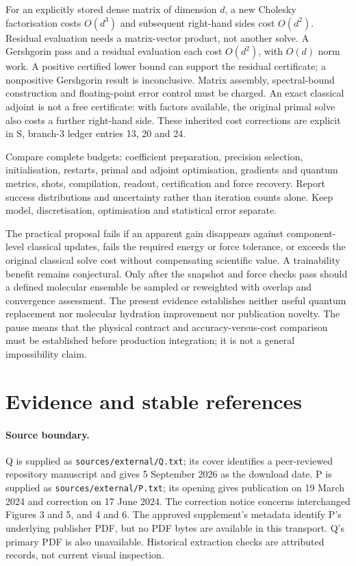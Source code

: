 \documentclass{article}
\begin{document}
For an explicitly stored dense matrix of dimension $d$, a new Cholesky factorisation costs $O(d^3)$ and subsequent right-hand sides cost $O(d^2)$. Residual evaluation needs a matrix-vector product, not another solve. A Gershgorin pass and a residual evaluation each cost $O(d^2)$, with $O(d)$ norm work. A positive certified lower bound can support the residual certificate; a nonpositive Gershgorin result is inconclusive. Matrix assembly, spectral-bound construction and floating-point error control must be charged. An exact classical adjoint is not a free certificate: with factors available, the original primal solve also costs a further right-hand side. These inherited cost corrections are explicit in S, branch-3 ledger entries 13, 20 and 24.

Compare complete budgets: coefficient preparation, precision selection, initialisation, restarts, primal and adjoint optimisation, gradients and quantum metrics, shots, compilation, readout, certification and force recovery. Report success distributions and uncertainty rather than iteration counts alone. Keep model, discretisation, optimisation and statistical error separate.

The practical proposal fails if an apparent gain disappears against component-level classical updates, fails the required energy or force tolerance, or exceeds the original classical solve cost without compensating scientific value. A trainability benefit remains conjectural. Only after the snapshot and force checks pass should a defined molecular ensemble be sampled or reweighted with overlap and convergence assessment. The present evidence establishes neither useful quantum replacement nor molecular hydration improvement nor publication novelty. The pause means that the physical contract and accuracy-versus-cost comparison must be established before production integration; it is not a general impossibility claim.

\appendix
\section{Evidence and stable references}

\paragraph{Source boundary.}
Q is supplied as \texttt{sources/external/Q.txt}; its cover identifies a peer-reviewed repository manuscript and gives 5 September 2026 as the download date. P is supplied as \texttt{sources/external/P.txt}; its opening gives publication on 19 March 2024 and correction on 17 June 2024. The correction notice concerns interchanged Figures 3 and 5, and 4 and 6. The approved supplement's metadata identify P's underlying publisher PDF, but no PDF bytes are available in this transport. Q's primary PDF is also unavailable. Historical extraction checks are attributed records, not current visual inspection.
\end{document}

